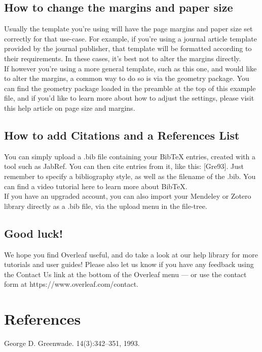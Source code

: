 \documentclass{article}
\begin{document}
	\subsection{How to change the margins and paper size}
	\begingroup
	Usually the template you’re using will have the page margins and paper size set correctly for that
	use-case. For example, if you’re using a journal article template provided by the journal publisher,
	that template will be formatted according to their requirements. In these cases, it’s best not to alter
	the margins directly.\\
	\indent If however you’re using a more general template, such as this one, and would like to alter the
	margins, a common way to do so is via the geometry package. You can find the geometry package
	loaded in the preamble at the top of this example file, and if you’d like to learn more about how to
	adjust the settings, please visit this help article on page size and margins.
	
	\endgroup
	\subsection{How to add Citations and a References List}
	\begingroup
	You can simply upload a .bib file containing your BibTeX entries, created with a tool such as JabRef.
	You can then cite entries from it, like this: [Gre93]. Just remember to specify a bibliography style, as
	well as the filename of the .bib. You can find a video tutorial here to learn more about BibTeX.\\
	\indent If you have an upgraded account, you can also import your Mendeley or Zotero library directly as
	a .bib file, via the upload menu in the file-tree.
	\endgroup
	\subsection{Good luck!}
	\begingroup
	We hope you find Overleaf useful, and do take a look at our help library for more tutorials and user
	guides! Please also let us know if you have any feedback using the Contact Us link at the bottom of
	the Overleaf menu — or use the contact form at https://www.overleaf.com/contact.
	
	\endgroup
	\section{References}
	\begingroup
	[Gre93] George D. Greenwade.
	14(3):342–351, 1993.
	
	\endgroup
\end{document}
